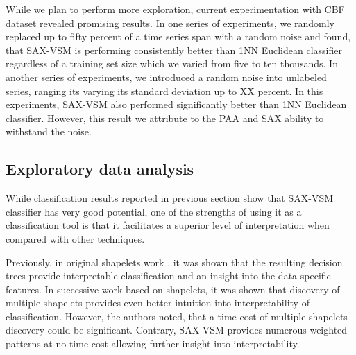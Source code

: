 \documentclass{llncs}
\begin{document}
While we plan to perform more exploration, current experimentation with CBF dataset revealed 
promising results. In one series of experiments, we randomly replaced up to fifty percent of a
time series span with a random noise and found, that SAX-VSM is performing consistently better 
than 1NN Euclidean classifier regardless of a training set size which we varied from five to
ten thousands. In another series of experiments, we introduced a random noise into unlabeled
series, ranging its varying its standard deviation up to XX percent. In this experiments, SAX-VSM
also performed significantly better than 1NN Euclidean classifier. However, this result we
attribute to the PAA and SAX ability to withstand the noise.


\subsection{Exploratory data analysis}
While classification results reported in previous section show that SAX-VSM classifier
has very good potential, one of the strengths of using it as a classification tool is that
it facilitates a superior level of interpretation when compared with other techniques. 

Previously, in original shapelets work \cite{shapelet}, it was shown 
that the resulting decision trees provide interpretable classification and an insight into the data
specific features. In successive work \cite{bagnal} based on shapelets, it was shown that
discovery of multiple shapelets provides even better intuition into interpretability of
classification. However, the authors noted, that a time cost of multiple shapelets discovery
could be significant. Contrary, SAX-VSM provides numerous weighted patterns at no time cost
allowing further insight into interpretability.
\end{document}
